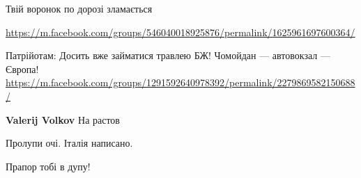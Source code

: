 \begin{itemize}
\begin{itemize}
Твій воронок по дорозі зламається
\end{itemize}

 
\url{https://m.facebook.com/groups/546040018925876/permalink/1625961697600364/}

 
Патрійотам:
Досить вже займатися травлею БЖ!
Чомойдан — автовокзал — Європа!
\url{https://m.facebook.com/groups/1291592640978392/permalink/2279869582150688/}

\begin{itemize}
 
\textbf{Valerij Volkov} На растов

 
Пролупи очі.
Італія написано.
\end{itemize}

 
Прапор тобі в дупу!

\begin{itemize}
 

\end{itemize}
\end{itemize}
